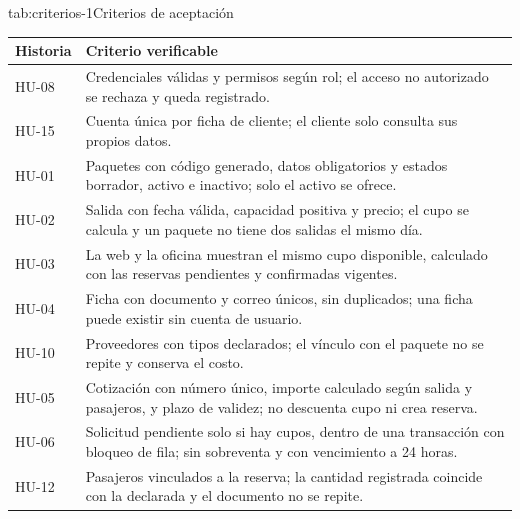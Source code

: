 \begin{tablaapa}{tab:criterios-1}{Criterios de aceptación}
\small
\begin{tabular}{@{}p{1.3cm}p{13cm}@{}}
\toprule
Historia & Criterio verificable \\
\midrule
HU-08 & Credenciales válidas y permisos según rol; el acceso no autorizado
se rechaza y queda registrado. \\
HU-15 & Cuenta única por ficha de cliente; el cliente solo consulta sus
propios datos. \\
HU-01 & Paquetes con código generado, datos obligatorios y estados borrador,
activo e inactivo; solo el activo se ofrece. \\
HU-02 & Salida con fecha válida, capacidad positiva y precio; el cupo se
calcula y un paquete no tiene dos salidas el mismo día. \\
HU-03 & La web y la oficina muestran el mismo cupo disponible, calculado con
las reservas pendientes y confirmadas vigentes. \\
HU-04 & Ficha con documento y correo únicos, sin duplicados; una ficha puede
existir sin cuenta de usuario. \\
HU-10 & Proveedores con tipos declarados; el vínculo con el paquete no se
repite y conserva el costo. \\
HU-05 & Cotización con número único, importe calculado según salida y
pasajeros, y plazo de validez; no descuenta cupo ni crea reserva. \\
HU-06 & Solicitud pendiente solo si hay cupos, dentro de una transacción con
bloqueo de fila; sin sobreventa y con vencimiento a 24 horas. \\
HU-12 & Pasajeros vinculados a la reserva; la cantidad registrada coincide
con la declarada y el documento no se repite. \\
\bottomrule
\end{tabular}
\end{tablaapa}

